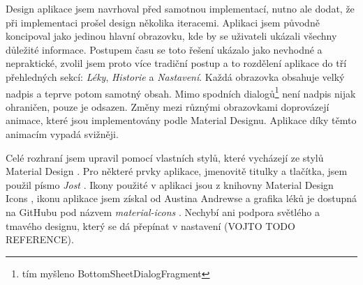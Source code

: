 \documentclass[../TakeYourPill.tex]{subfiles}
\begin{document}
Design aplikace jsem navrhoval před samotnou implementací, nutno ale dodat, že při implementaci prošel design několika iteracemi. Aplikaci jsem původně koncipoval jako jedinou hlavní obrazovku, kde by se uživateli ukázali všechny důležité informace. Postupem času se toto řešení ukázalo jako nevhodné a nepraktické, zvolil jsem proto více tradiční postup a to rozdělení aplikace do tří přehledných sekcí: \textit{Léky}, \textit{Historie} a \textit{Nastavení}. Každá obrazovka obsahuje velký nadpis a teprve potom samotný obsah. Mimo spodních dialogů\footnote{tím myšleno BottomSheetDialogFragment} není nadpis nijak ohraničen, pouze je odsazen. Změny mezi různými obrazovkami doprovázejí animace, které jsou implementovány podle Material Designu. Aplikace díky těmto animacím vypadá svižněji.

Celé rozhraní jsem upravil pomocí vlastních stylů, které vycházejí ze stylů Material Design \cite{materialdesign}. Pro některé prvky aplikace, jmenovitě titulky a tlačítka, jsem použil písmo \textit{Jost} \cite{jost}. Ikony použité v aplikaci jsou z knihovny Material Design Icons \cite{icons}, ikonu aplikace jsem získal od Austina Andrewse \cite{pill-icon} a grafika léků je dostupná na GitHubu pod názvem \textit{material-icons} \cite{pills-icons}. Nechybí ani podpora světlého a tmavého designu, který se dá přepínat v nastavení (VOJTO TODO REFERENCE).
\end{document}
